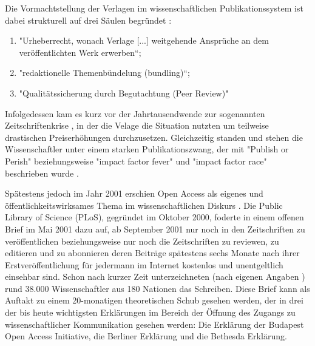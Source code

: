 Die Vormachtstellung der Verlagen im wissenschaftlichen Publikationssystem ist dabei strukturell auf drei Säulen begründet \cite{offhaus_2012_institutionelle_repos} \cite{bargheer_2006_open}: 
\begin{enumerate}
\item "Urheberrecht, wonach Verlage [...] weitgehende Ansprüche an dem veröffentlichten Werk erwerben“;
\item "redaktionelle Themenbündelung (bundling)“;
\item "Qualitätssicherung durch Begutachtung (Peer Review)"
\end{enumerate}

Infolgedessen kam es kurz vor der Jahrtausendwende zur sogenannten Zeitschriftenkrise \cite{suchen}, in der die Velage die Situation nutzten um teilweise drastischen Preiserhöhungen durchzusetzen. Gleichzeitig standen und stehen die Wissenschaftler unter einem starken Publikationszwang, der mit "Publish or Perish" \cite{CLAPHAM_2005} beziehungsweise "impact factor fever" \cite{Cherubini_2008} und "impact factor race" \cite{Brischoux_2009} beschrieben wurde \cite{offhaus_2012_institutionelle_repos}. 

Spätestens jedoch im Jahr 2001 erschien Open Access als eigenes und öffentlichkeitswirksames Thema im wissenschaftlichen Diskurs \cite{cite:19}. Die Public Library of Science (PLoS), gegründet im Oktober 2000, foderte in einem offenen Brief im Mai 2001 \cite{cite:20} dazu auf, ab September 2001 nur noch in den Zeitschriften zu veröffentlichen beziehungsweise nur noch die Zeitschriften zu reviewen, zu editieren und zu abonnieren deren Beiträge spätestens sechs Monate nach ihrer Erstveröffentlichung für jedermann im Internet kostenlos und unentgeltlich einsehbar sind. Schon nach kurzer Zeit unterzeichneten (nach eigenen Angaben \cite{cite:19a}) rund 38.000 Wissenschaftler aus 180 Nationen das Schreiben. Diese Brief kann als Auftakt zu einem 20-monatigen theoretischen Schub gesehen werden, der in drei der bis heute wichtigsten Erklärungen im Bereich der Öffnung des Zugangs zu wissenschaftlicher Kommunikation gesehen werden: Die Erklärung der Budapest Open Access Initiative, die Berliner Erklärung und die Bethesda Erklärung. \cite{CREATe_2014}

